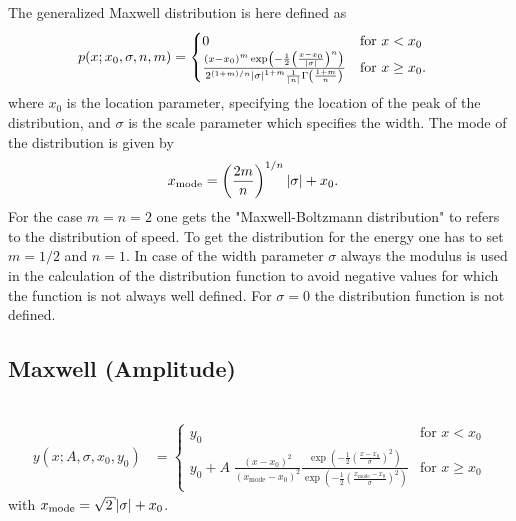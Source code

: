 The generalized Maxwell distribution is here defined as
\begin{align}
p(x; x_0, \sigma, n, m) &=
\begin{cases}
0 & \mbox{for~} x<x_0 \\
   \frac{\left(x-x_0\right)^m \exp\left(-\frac{1}{2}\left(\frac{x-x_0}{\abs{\sigma}}\right)^n\right)}{
   2^{(1+m)/n}\abs{\sigma}^{1+m} \frac{1}{\abs{n}}\Gamma\left(\frac{1+m}{n}\right)}
   & \mbox{for~} x \geq x_0 .\\
\end{cases}
\end{align}
where $x_0$ is the location parameter, specifying the location of
the peak of the distribution, and $\sigma$ is the scale parameter
which specifies the width. The mode of the distribution is given
by
\begin{align}
x_\text{mode} &= \left(\frac{2m}{n}\right)^{1/n} \abs{\sigma}+x_0
.
\end{align}
For the case $m=n=2$ one gets the "Maxwell-Boltzmann distribution"
to refers to the distribution of speed. To get the distribution
for the energy one has to set $m=1/2$ and $n=1$. In case of the
width parameter $\sigma$ always the modulus is used in the
calculation of the distribution function to avoid negative values
for which the function is not always well defined. For $\sigma=0$
the distribution function is not defined.

\clearpage
\subsection{Maxwell (Amplitude)} ~\\
\label{sec:MaxwellAmplitude}
\begin{align}
y(x;A,\sigma,x_0,y_0) &=
\begin{cases}
y_0 & \mbox{for~} x < x_0 \\
y_0 +  A \;
\frac{\left(x-x_0\right)^2}{\left(x_\text{mode}-x_0\right)^2}
        \frac{\exp\left(-\frac{1}{2}\left(\frac{x-x_0}{\sigma}\right)^2\right)}{
        \exp\left(-\frac{1}{2}\left(\frac{x_\text{mode}-x_0}{\sigma}\right)^2\right)}
& \mbox{for~} x \geq x_0
\end{cases}
\end{align}
with $x_\text{mode}=\sqrt{2}\abs{\sigma}+x_0$.

